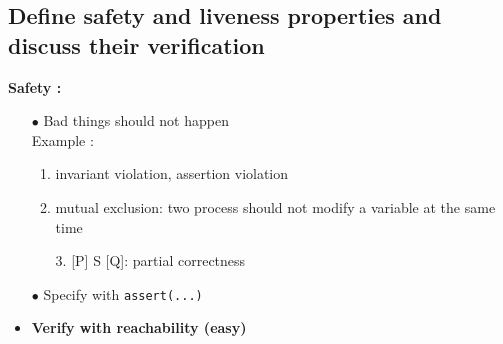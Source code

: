\documentclass{article}
\begin{document}
\subsection{Define safety and liveness properties and discuss their verification}
\vspace*{-0.5cm}
\begin{multicols}{2}
\noindent\textbf{Safety :} 
\begin{itemize}
    \item [$\bullet$]Bad things should not happen\\
    Example :
    \begin{enumerate}
        \item invariant violation, assertion violation
        \item mutual exclusion: two process should not modify a variable at the same time
        \item[3.] [P] S [Q]: partial correctness
    \end{enumerate}
    \item [$\bullet$]Specify with \lstinline{assert(...)}
    \item [$\bullet$]\textbf{Verify with reachability (easy)}
    

\end{itemize}
\end{multicols}
\end{document}
